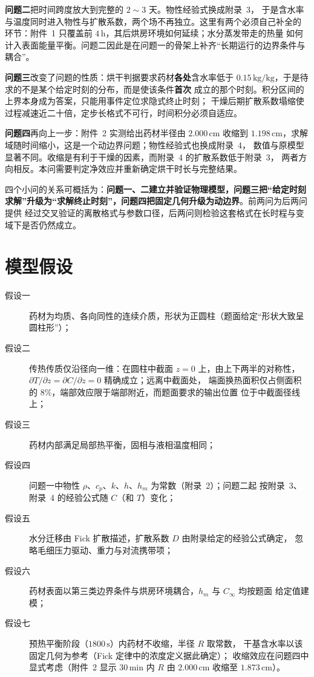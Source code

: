 \documentclass[withoutpreface,bwprint]{cumcmthesis} %
\begin{document}
\textbf{问题二}把时间跨度放大到完整的 $2\sim3$ 天。物性经验式换成附录~3，
于是含水率与温度同时进入物性与扩散系数，两个场不再独立。这里有两个必须自己补全的
环节：附件~1 只覆盖前 $4\,\mathrm{h}$，其后烘房环境如何延续；水分蒸发带走的热量
如何计入表面能量平衡。问题二因此是在问题一的骨架上补齐“长期运行的边界条件与耦合”。

\textbf{问题三}改变了问题的性质：烘干判据要求药材\textbf{各处}含水率低于
$0.15\,\mathrm{kg/kg}$，于是待求的不是某个给定时刻的分布，而是使该条件\textbf{首次}
成立的那个时刻。积分区间的上界本身成为答案，只能用事件定位求隐式终止时刻；
干燥后期扩散系数塌缩使过程减速近二十倍，定步长格式不可行，时间积分必须自适应。

\textbf{问题四}再向上一步：附件~2 实测给出药材半径由 $2.000\,\mathrm{cm}$ 收缩到
$1.198\,\mathrm{cm}$，求解域随时间缩小，这是一个动边界问题；物性经验式也换成附录~4，
数值与原模型显著不同。收缩是有利于干燥的因素，而附录~4 的扩散系数低于附录~3，
两者方向相反。本问需要判定净效应并重新确定烘干时长与完整结果。

四个小问的关系可概括为：\textbf{问题一、二建立并验证物理模型，问题三把“给定时刻
求解”升级为“求解终止时刻”，问题四把固定几何升级为动边界}。前两问为后两问提供
经过交叉验证的离散格式与参数口径，后两问则检验这套格式在长时程与变域下是否仍然成立。


\section{模型假设}
\begin{description}
    \item[假设一] 药材为均质、各向同性的连续介质，形状为正圆柱（题面给定``形状大致呈圆柱形''）；
    \item[假设二] 传热传质仅沿径向一维：在圆柱中截面 $z=0$ 上，由上下两半的对称性，
    $\partial T/\partial z=\partial C/\partial z=0$ 精确成立；远离中截面处，
    端面换热面积仅占侧面积的 $8\%$，端部效应限于端部附近，而题面要求的输出位置
    位于中截面径线上；
    \item[假设三] 药材内部满足局部热平衡，固相与液相温度相同；
    \item[假设四] 问题一中物性 $\rho$、$c_p$、$k$、$h$、$h_m$ 为常数（附录~2）；问题二起
    按附录~3、附录~4 的经验公式随 $C$（和 $T$）变化；
    \item[假设五] 水分迁移由 Fick 扩散描述，扩散系数 $D$ 由附录给定的经验公式确定，
    忽略毛细压力驱动、重力与对流携带项；
    \item[假设六] 药材表面以第三类边界条件与烘房环境耦合，$h_m$ 与 $C_\infty$ 均按题面
    给定值建模；
    \item[假设七] 预热平衡阶段（$1800\,\mathrm{s}$）内药材不收缩，半径 $R$ 取常数，
    干基含水率以该固定几何为参考（Fick 定律中的浓度定义据此确定）；
    收缩效应在问题四中显式考虑（附件~2 显示 $30\,\mathrm{min}$ 内 $R$ 由
    $2.000\,\mathrm{cm}$ 收缩至 $1.873\,\mathrm{cm}$）。
\end{description}
\end{document}

